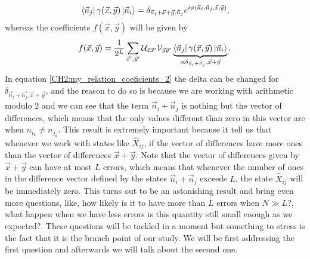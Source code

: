 \begin{equation}
\mathinner{\langle{\vec{n}_j}|}\gamma(\vec{x},\vec{y})\mathinner{|{\vec{n}_i}\rangle}=\delta_{\vec{n}_i+\vec{x}+\vec{y},\vec{n}_j}e^{i\phi(\vec{n}_i,\vec{n}_j,\vec{x},\vec{y})},
\label{CH2:my_relation_coeficients_2}
\end{equation}
whereas the coefficients $f(\vec{x},\vec{y})$ will be given by
\begin{equation}
f(\vec{x},\vec{y}) = \frac{1}{2^L}\sum_{\vec{x}',\vec{y}'} \mathcal{U}_{\vec{x}\vec{x}'} \mathcal{V}_{\vec{y}\vec{y}'} \underbrace{\mathinner{\langle{\vec{n}_j}|}\gamma(\vec{x},\vec{y})\mathinner{|{\vec{n}_i}\rangle}}_{\propto \delta_{\vec{n}_i+\vec{n}_j},\vec{x}+\vec{y}}.
\label{CH2:my_Relation_coeffitients_final}
\end{equation}
\indent In equation \eqref{CH2:my_relation_coeficients_2} the delta can be changed for $\delta_{\vec{n}_i+\vec{n_j},\vec{x}+\vec{y}}$, and the reason to do so is because we are working with arithmetic modulo $2$ and we can see that the term $\vec{n}_i+\vec{n}_j$ is nothing but the vector of differences, which means that the only values different than zero in this vector are when $n_{i_k}\neq n_{j_k}$. This result is extremely important because it tell us that whenever we work with states like $\hat{X}_{ij}$, if the vector of differences have more ones than the vector of differences $\vec{x}+\vec{y}$. Note that the vector of differences given by $\vec{x}+\vec{y}$ can have at most $L$ errors, which means that whenever the number of ones in the difference vector defined by the states $\vec{n}_i+\vec{n}_j$ exceeds $L$, the state $\hat{X}_{ij}$ will be immediately zero. This turns out to be an astonishing result and bring even more questions, like, how likely is it to have more than $L$ errors when $N\gg L$?, what happen when we have less errors is this quantity still small enough as we expected?. These questions will be tackled in a moment but something to stress is the fact that it is the branch point of our study. We will be first addressing the first question and afterwards we will talk about the second one.
